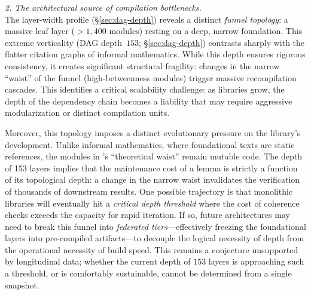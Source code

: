 \medskip
\noindent \textit{2. The architectural source of compilation bottlenecks.} \\
The layer-width profile (\S\ref{sec:dag-depth}) reveals a distinct \textit{funnel topology}: a massive leaf layer ($>1,400$ modules) resting on a deep, narrow foundation. This extreme verticality (DAG depth~$153$; \S\ref{sec:dag-depth}) contrasts sharply with the flatter citation graphs of informal mathematics. While this depth ensures rigorous consistency, it creates significant structural fragility: changes in the narrow ``waist'' of the funnel (high-betweenness modules) trigger massive recompilation cascades. This identifies a critical scalability challenge: as libraries grow, the depth of the dependency chain becomes a liability that may require aggressive modularization or distinct compilation units.

Moreover, this topology imposes a distinct evolutionary pressure on the library's development. Unlike informal mathematics, where foundational texts are static references, the modules in 's ``theoretical waist'' remain mutable code. The depth of 153 layers implies that the maintenance cost of a lemma is strictly a function of its topological depth: a change in the narrow waist invalidates the verification of thousands of downstream results. One possible trajectory is that monolithic libraries will eventually hit a \textit{critical depth threshold} where the cost of coherence checks exceeds the capacity for rapid iteration. If so, future architectures may need to break this funnel into \textit{federated tiers}---effectively freezing the foundational layers into pre-compiled artifacts---to decouple the logical necessity of depth from the operational necessity of build speed. This remains a conjecture unsupported by longitudinal data; whether the current depth of $153$ layers is approaching such a threshold, or is comfortably sustainable, cannot be determined from a single snapshot.

